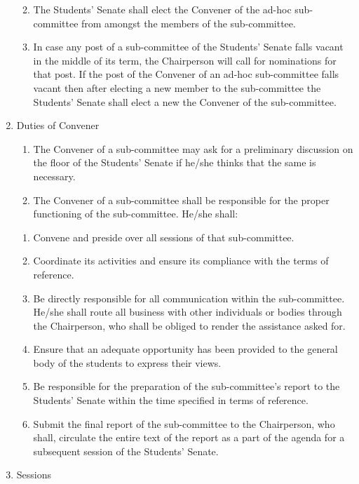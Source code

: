 \begin{enumerate}
  \begin{enumerate}
  \def\labelenumii{\alph{enumii}.}
  \setcounter{enumii}{2}
  \item
    The Students' Senate shall elect the Convener of the ad-hoc sub-
    committee from amongst the members of the sub-committee.
  \item
    In case any post of a sub-committee of the Students' Senate falls
    vacant in the middle of its term, the Chairperson will call for
    nominations for that post. If the post of the Convener of an ad-hoc
    sub-committee falls vacant then after electing a new member to the
    sub-committee the Students' Senate shall elect a new the Convener of
    the sub-committee.
  \end{enumerate}
\item
  Duties of Convener

  \begin{enumerate}
  \def\labelenumii{\alph{enumii}.}
  \item
    The Convener of a sub-committee may ask for a preliminary discussion
    on the floor of the Students' Senate if he/she thinks that the same
    is necessary.
  \item
    The Convener of a sub-committee shall be responsible for the proper
    functioning of the sub-committee. He/she shall:
  \end{enumerate}

  \begin{enumerate}
  \def\labelenumii{\arabic{enumii}.}
  \item
    Convene and preside over all sessions of that sub-committee.
  \item
    Coordinate its activities and ensure its compliance with the terms
    of reference.
  \item
    Be directly responsible for all communication within the
    sub-committee. He/she shall route all business with other
    individuals or bodies through the Chairperson, who shall be obliged
    to render the assistance asked for.
  \item
    Ensure that an adequate opportunity has been provided to the general
    body of the students to express their views.
  \item
    Be responsible for the preparation of the sub-committee's report to
    the Students' Senate within the time specified in terms of
    reference.
  \item
    Submit the final report of the sub-committee to the Chairperson, who
    shall, circulate the entire text of the report as a part of the
    agenda for a subsequent session of the Students' Senate.
  \end{enumerate}
\item
  Sessions


\end{enumerate}
